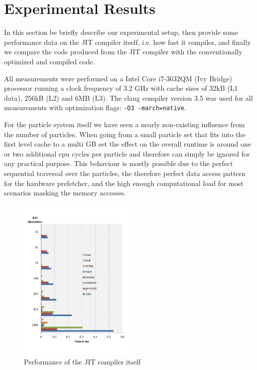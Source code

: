 \section{Experimental Results}\label{sec:exp}

In this section be briefly describe our experimental setup, then provide some performance data on the JIT compiler itself, i.e. how fast it compiles, and finally we compare the code produced from the JIT compiler with the conventionally optimized and compiled code.


All measurements were performed on a Intel Core i7-3632QM (Ivy Bridge) processor running a clock frequency of 3.2 GHz with cache sizes of 32kB (L1 data), 256kB (L2) and 6MB (L3). The clang compiler version 3.5 was used for all measurements with optimization flags: \texttt{-O3 -march=native}.

For the particle system itself we have seen a nearly non-existing influence from the number of particles. When going from a small particle set that fits into the first level cache to a multi GB set the effect on the overall runtime is around one or two additional cpu cycles per particle and therefore can simply be ignored for any practical purpose. This behaviour is mostly possible due to the perfect sequential traversal over the particles, the therefore perfect data access pattern for the hardware prefetcher, and the high enough computational load for most scenarios masking the memory accesses.



\begin{figure}[t]\centering
  \includegraphics[width=0.5\textwidth]{jit_perf.pdf}
  \caption{Performance of the JIT compiler itself
  \label{perf_jit}}
\end{figure}

